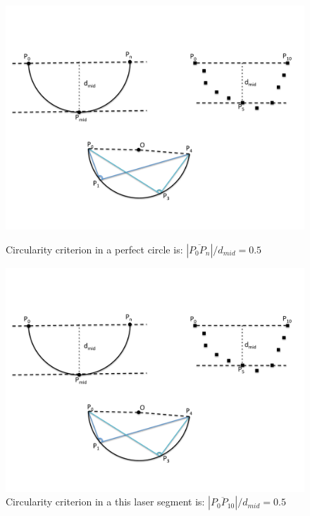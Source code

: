 \begin{enumerate}
\begin{figure}[ht!]
  \centering
  \begin{minipage}[b]{0.49\textwidth}
    \includegraphics[width=\textwidth]{pics/circ1}   
    \caption{Circularity criterion in a perfect circle is: $|\overline{P_0P_n}|/d_{mid}=0.5$}
     \label{fig:circ1}
  \end{minipage}
  \hfill
  \begin{minipage}[b]{0.49\textwidth}
    \includegraphics[width=\textwidth]{pics/circ2}    
    \caption{Circularity criterion in a this laser segment is: $|\overline{P_0P_{10}}|/d_{mid}=0.5$}
    \label{fig:circ2}
  \end{minipage}
\end{figure}


\end{enumerate}
